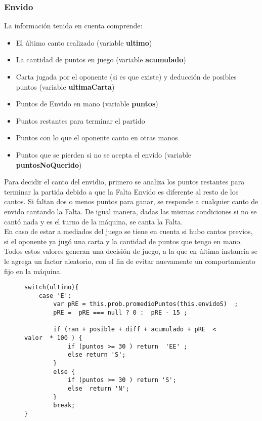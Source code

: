 \documentclass[12pt,a4paper]{article}
\begin{document}
\subsubsection{Envido}
La informaci\'on tenida en cuenta comprende:
\begin{itemize}
\item El \'ultimo canto realizado (variable \textbf{ultimo})
\item La cantidad de puntos en juego (variable \textbf{acumulado})
\item Carta jugada por el oponente (si es que existe) y deducci\'on de posibles puntos (variable \textbf{ultimaCarta})
\item Puntos de Envido en mano (variable \textbf{puntos})
\item Puntos restantes para terminar el partido
\item Puntos con lo que el oponente canto en otras manos
\item Puntos que se pierden si no se acepta el envido (variable \textbf{puntosNoQuerido})
\end{itemize}


Para decidir el canto del envidio, primero se analiza los puntos restantes para terminar la partida debido a que la Falta Envido es diferente al 
resto de los cantos. Si faltan dos o menos puntos para ganar, se responde a cualquier canto de envido cantando la Falta. De igual manera, dadas
las mismas condiciones si no se cant\'o nada y es el turno de la m\'aquina, se canta la Falta.\\
\noindent En caso de estar a mediados del juego se tiene en cuenta si hubo cantos previos, si el oponente ya jug\'o una carta y la cantidad de puntos que tengo en mano. 
Todos estos valores generan una decisi\'on de juego, a la que en \'ultima instancia se le agrega un factor aleatorio, con el fin de evitar nuevamente
un comportamiento fijo en la m\'aquina.

\newpage


\begin{figure}[h]
\lstset{language=java,caption=Extracto de la funci\'on envido,label=lst:nicecode}
\begin{lstlisting}
switch(ultimo){
	case 'E':
		var pRE = this.prob.promedioPuntos(this.envidoS)  ;
		pRE =  pRE === null ? 0 :  pRE - 15 ; 
										                  
		if (ran + posible + diff + acumulado + pRE  <  valor  * 100 ) {
			if (puntos >= 30 ) return  'EE' ; 
			else return 'S';
		} 
		else { 
			if (puntos >= 30 ) return 'S'; 
			else  return 'N';  
		}
		break;
}

\end{lstlisting}
\end{figure}
\end{document}
